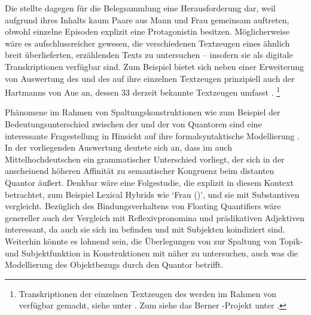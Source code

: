 Die \KC{} stellte dagegen für die Belegsammlung eine Herausforderung dar, weil
aufgrund ihres Inhalts kaum Paare aus Mann und Frau gemeinsam auftreten, obwohl
einzelne Episoden explizit eine Protagonistin besitzen. Möglicherweise wäre es
aufschlussreicher gewesen, die verschiedenen Textzeugen eines ähnlich breit
überlieferten, erzählenden Texts zu untersuchen -- insofern sie als digitale
Transkriptionen verfügbar sind. Zum Beispiel bietet sich
neben einer Erweiterung von  Auswertung des
 und des  auf ihre einzelnen Textzeugen prinzipiell
auch der  Hartmanns von Aue an, dessen  33
derzeit bekannte Textzeugen umfasst \autocites[vgl.][s.\,v.~\textit{Hartmann
von Aue: }]{hsc}.%
%
	\footnote{Transkriptionen der einzelnen Textzeugen des
		 werden im Rahmen von  verfügbar
		gemacht, siehe unter . Zum  siehe das
		Berner -Projekt unter .%
	}

Phänomene im Rahmen von Spaltungskonstruktionen wie zum Beispiel der
Bedeutungs\-unterschied zwischen der  und der
 von Quantoren sind eine interessante Fragestellung in
Hinsicht auf ihre formal\-syntaktische Modellierung \parencite[siehe
z.\,B.][]{pittner1995,merchant1996,fanselowcavar2002,nolda2007,shen2019}. In
der vorliegenden Auswertung deutete sich an, dass im auch
Mittelhochdeutschen ein grammatischer Unterschied
vorliegt, der sich in der anscheinend höheren Affinität zu semantischer
Kongruenz beim distanten Quantor äußert. Denkbar wäre eine Folgestudie, die
explizit   in diesem Kontext
betrachtet, zum Beispiel Lexical Hybrids wie 
`Frau (\NeutF)', und sie mit  Substantiven
vergleicht. Bezüglich des Bindungsverhaltens von Floating
Quantifiers wäre genereller auch der Vergleich mit
Reflexivpronomina und prädikativen
Adjektiven interessant, da auch sie sich im
 befinden und mit Subjekten koindiziert sind.
Weiterhin könnte es lohnend sein, die Überlegungen von \citet{spector2009} zur
Spaltung von Topik- und Subjektfunktion in Konstruktionen mit
 näher zu untersuchen, auch was die Modellierung des
Objektbezugs durch den Quantor betrifft.

